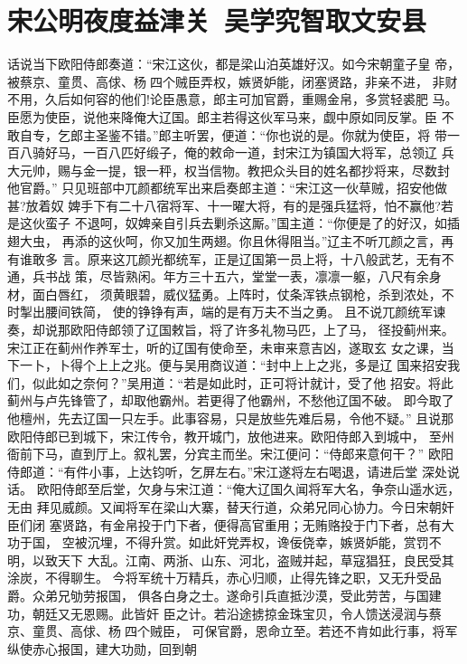 \chapter{宋公明夜度益津关~吴学究智取文安县}

话说当下欧阳侍郎奏道：“宋江这伙，都是梁山泊英雄好汉。如今宋朝童子皇
帝，被蔡京、童贯、高俅、杨四个贼臣弄权，嫉贤妒能，闭塞贤路，非亲不进，
非财不用，久后如何容的他们!论臣愚意，郎主可加官爵，重赐金帛，多赏轻裘肥
马。臣愿为使臣，说他来降俺大辽国。郎主若得这伙军马来，觑中原如同反掌。臣
不敢自专，乞郎主圣鉴不错。”郎主听罢，便道：“你也说的是。你就为使臣，将
带一百八骑好马，一百八匹好缎子，俺的敕命一道，封宋江为镇国大将军，总领辽
兵大元帅，赐与金一提，银一秤，权当信物。教把众头目的姓名都抄将来，尽数封
他官爵。”
只见班部中兀颜都统军出来启奏郎主道：“宋江这一伙草贼，招安他做甚?放着奴
婢手下有二十八宿将军、十一曜大将，有的是强兵猛将，怕不赢他?若是这伙蛮子
不退呵，奴婢亲自引兵去剿杀这厮。”国主道：“你便是了的好汉，如插翅大虫，
再添的这伙呵，你又加生两翅。你且休得阻当。”辽主不听兀颜之言，再有谁敢多
言。原来这兀颜光都统军，正是辽国第一员上将，十八般武艺，无有不通，兵书战
策，尽皆熟闲。年方三十五六，堂堂一表，凛凛一躯，八尺有余身材，面白唇红，
须黄眼碧，威仪猛勇。上阵时，仗条浑铁点钢枪，杀到浓处，不时掣出腰间铁简，
使的铮铮有声，端的是有万夫不当之勇。
且不说兀颜统军谏奏，却说那欧阳侍郎领了辽国敕旨，将了许多礼物马匹，上了马，
径投蓟州来。宋江正在蓟州作养军士，听的辽国有使命至，未审来意吉凶，遂取玄
女之课，当下一卜，卜得个上上之兆。便与吴用商议道：“封中上上之兆，多是辽
国来招安我们，似此如之奈何？”吴用道：“若是如此时，正可将计就计，受了他
招安。将此蓟州与卢先锋管了，却取他霸州。若更得了他霸州，不愁他辽国不破。
即今取了他檀州，先去辽国一只左手。此事容易，只是放些先难后易，令他不疑。”
且说那欧阳侍郎已到城下，宋江传令，教开城门，放他进来。欧阳侍郎入到城中，
至州衙前下马，直到厅上。叙礼罢，分宾主而坐。宋江便问：“侍郎来意何干？”
欧阳侍郎道：“有件小事，上达钧听，乞屏左右。”宋江遂将左右喝退，请进后堂
深处说话。
欧阳侍郎至后堂，欠身与宋江道：“俺大辽国久闻将军大名，争奈山遥水远，无由
拜见威颜。又闻将军在梁山大寨，替天行道，众弟兄同心协力。今日宋朝奸臣们闭
塞贤路，有金帛投于门下者，便得高官重用；无贿赂投于门下者，总有大功于国，
空被沉埋，不得升赏。如此奸党弄权，谗佞侥幸，嫉贤妒能，赏罚不明，以致天下
大乱。江南、两浙、山东、河北，盗贼并起，草寇猖狂，良民受其涂炭，不得聊生。
今将军统十万精兵，赤心归顺，止得先锋之职，又无升受品爵。众弟兄劬劳报国，
俱各白身之士。遂命引兵直抵沙漠，受此劳苦，与国建功，朝廷又无恩赐。此皆奸
臣之计。若沿途掳掠金珠宝贝，令人馈送浸润与蔡京、童贯、高俅、杨四个贼臣，
可保官爵，恩命立至。若还不肯如此行事，将军纵使赤心报国，建大功勋，回到朝
